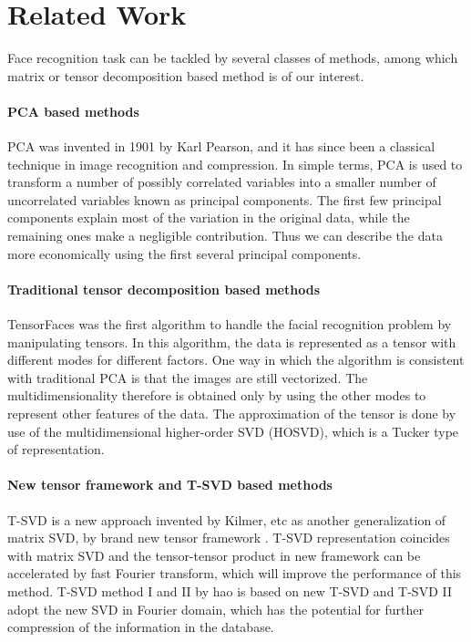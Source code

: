 \documentclass[english]{article}
\newcommand{\<}{\langle}
\renewcommand{\>}{\rangle}
\theoremstyle{definition}
\begin{document}
\section{Related Work}
Face recognition task can be tackled by several classes of methods, among which matrix or tensor decomposition based method is of our interest. 
\paragraph{PCA based methods}
PCA was invented in 1901 by Karl Pearson\cite{pearson1901liii}, and
it has since been a classical technique in image recognition and compression. In simple terms,
PCA is used to transform a number of possibly correlated variables into a smaller number of
uncorrelated variables known as principal components. The first few principal components
explain most of the variation in the original data, while the remaining ones make a negligible
contribution. Thus we can describe the data more economically using the first several principal
components. 
\paragraph{Traditional tensor decomposition based methods}
TensorFaces \cite{vasilescu2002multilinear} was the first algorithm to handle the facial recognition
problem by manipulating tensors. In this algorithm, the data is represented as a tensor
with different modes for different factors. One way in which the algorithm is consistent with
traditional PCA is that the images are still vectorized. The multidimensionality therefore is
obtained only by using the other modes to represent other features of the data. The approximation
of the tensor is done by use of the multidimensional higher-order SVD (HOSVD),
which is a Tucker type of representation. 
\paragraph{New tensor framework and T-SVD based methods}
T-SVD is a new approach invented by Kilmer, etc \cite{kilmer2008third}\cite{kilmer2011factorization}\cite{kilmer2013third} as another generalization of matrix SVD, by brand new tensor framework\cite{kilmer2011factorization} . T-SVD representation coincides with matrix SVD and the tensor-tensor product in new framework can be accelerated by fast Fourier transform, which will improve the performance of this method. T-SVD method I and II by hao \cite{hao2013facial} is based on new T-SVD and T-SVD II adopt the new SVD in Fourier domain, which has the potential for further compression of the information in the database. 
\end{document}
